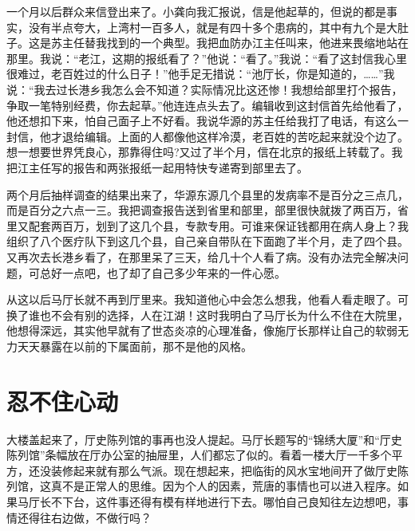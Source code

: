 \documentclass[12pt,oneside]{book}
\begin{document}
一个月以后群众来信登出来了。小龚向我汇报说，信是他起草的，但说的都是事实，没有半点夸大，上湾村一百多人，就是有四十多个患病的，其中有九个是大肚子。这是苏主任替我找到的一个典型。我把血防办江主任叫来，他进来畏缩地站在那里。我说：``老江，这期的报纸看了？''他说：``看了。''我说：``看了这封信我心里很难过，老百姓过的什么日子！''他手足无措说：``池厅长，你是知道的，\ldots\ldots{}''我说：``我去过长港乡我怎么会不知道？实际情况比这还惨！我想给部里打个报告，争取一笔特别经费，你去起草。''他连连点头去了。编辑收到这封信首先给他看了，他还想扣下来，怕自己面子上不好看。我说华源的苏主任给我打了电话，有这么一封信，他才退给编辑。上面的人都像他这样冷漠，老百姓的苦吃起来就没个边了。想一想要世界凭良心，那靠得住吗?又过了半个月，信在北京的报纸上转载了。我把江主任写的报告和两张报纸一起用特快专递寄到部里去了。

两个月后抽样调查的结果出来了，华源东源几个县里的发病率不是百分之三点几，而是百分之六点一三。我把调查报告送到省里和部里，部里很快就拨了两百万，省里又配套两百万，划到了这几个县，专款专用。可谁来保证钱都用在病人身上？我组织了八个医疗队下到这几个县，自己亲自带队在下面跑了半个月，走了四个县。又再次去长港乡看了，在那里呆了三天，给几十个人看了病。没有办法完全解决问题，可总好一点吧，也了却了自己多少年来的一件心愿。

从这以后马厅长就不再到厅里来。我知道他心中会怎么想我，他看人看走眼了。可换了谁也不会有别的选择，人在江湖！这时我明白了马厅长为什么不住在大院里，他想得深远，其实他早就有了世态炎凉的心理准备，像施厅长那样让自己的软弱无力天天暴露在以前的下属面前，那不是他的风格。


\chapter{忍不住心动}

大楼盖起来了，厅史陈列馆的事再也没人提起。马厅长题写的``锦绣大厦''和``厅史陈列馆''条幅放在厅办公室的抽屉里，人们都忘了似的。看着一楼大厅一千多个平方，还没装修起来就有那么气派。现在想起来，把临街的风水宝地间开了做厅史陈列馆，这真不是正常人的思维。因为个人的因素，荒唐的事情也可以进入程序。如果马厅长不下台，这件事还得有模有样地进行下去。哪怕自己良知往左边想吧，事情还得往右边做，不做行吗？
\end{document}
